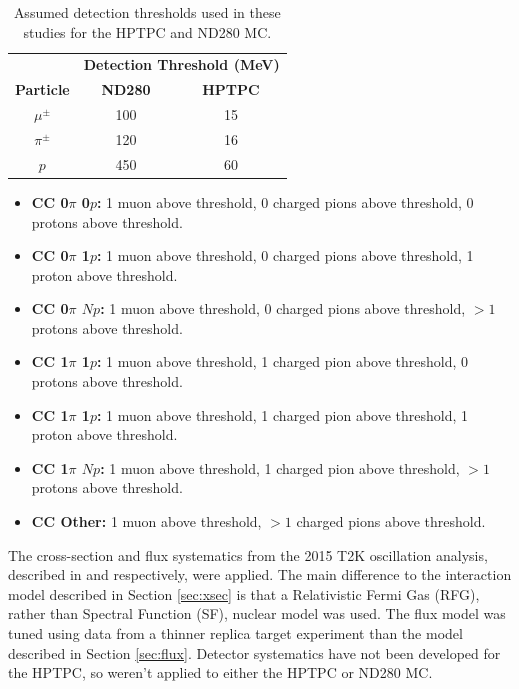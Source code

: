 \begin{center}
\begin{table}[!htpb]
\center
\begin{tabular}{c ||c c}
\hline \hline
 & \multicolumn{2}{c}{\textbf{Detection Threshold (MeV)}}\\
\textbf{Particle} & \textbf{ND280} & \textbf{HPTPC} \\
 \hline \hline
$\mu^{\pm}$ & 100 & 15 \\
$\pi^{\pm}$ & 120 & 16 \\
$p$ & 450 & 60 \\
\hline \hline
\end{tabular}
\caption{Assumed detection thresholds used in these studies for the HPTPC and ND280 MC.}
\label{tab:hptpcthresh}
\end{table}
\end{center}

\vspace{-1cm}
\begin{itemize}

\item \textbf{CC 0$\pi$ 0$p$:} 1 muon above threshold, 0 charged pions above threshold, 0 protons above threshold.

\item \textbf{CC 0$\pi$ 1$p$:} 1 muon above threshold, 0 charged pions above threshold, 1 proton above threshold.

\item \textbf{CC 0$\pi$ $Np$:} 1 muon above threshold, 0 charged pions above threshold, $>1$ protons above threshold.

\item \textbf{CC 1$\pi$ 1$p$:} 1 muon above threshold, 1 charged pion above threshold, 0 protons above threshold.

\item \textbf{CC 1$\pi$ 1$p$:} 1 muon above threshold, 1 charged pion above threshold, 1 proton above threshold.

\item \textbf{CC 1$\pi$ $Np$:} 1 muon above threshold, 1 charged pion above threshold, $>1$ protons above threshold.

\item \textbf{CC Other:} 1 muon above threshold, $>1$ charged pions above threshold.

\end{itemize}

The cross-section and flux systematics from the 2015 T2K oscillation analysis, described in \cite{tn265} and \cite{tn217} respectively, were applied. The main difference to the interaction model described in Section \ref{sec:xsec} is that a Relativistic Fermi Gas (RFG), rather than Spectral Function (SF), nuclear model was used. The flux model was tuned using data from a thinner replica target experiment than the model described in Section \ref{sec:flux}. Detector systematics have not been developed for the HPTPC, so weren't applied to either the HPTPC or ND280 MC.

